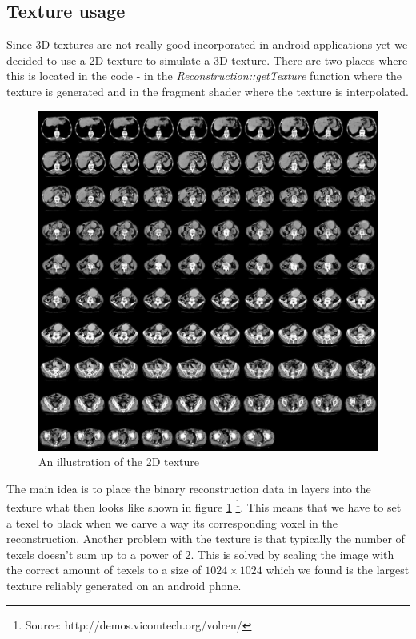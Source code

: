 \documentclass[10pt,twocolumn,letterpaper]{article}
\begin{document}
\subsection{Texture usage}

Since 3D textures are not really good incorporated in android applications yet we decided to use a 2D texture to simulate a 3D texture. There are two places where this is located in the code - in the \emph{Reconstruction::getTexture} function where the texture is generated and in the fragment shader where the texture is interpolated.

\begin{figure}[h]
	\begin{center}
		\includegraphics[width=0.8\linewidth]{./texture.jpg}
		\caption{An illustration of the 2D texture}
		\label{fig:texture}
	\end{center}
\end{figure}
The main idea is to place the binary reconstruction data in layers into the texture what then looks like shown in figure \ref{fig:texture} \footnote{Source: http://demos.vicomtech.org/volren/}. This means that we have to set a texel to black when we carve a way its corresponding voxel in the reconstruction. Another problem with the texture is that typically the number of texels doesn't sum up to a power of 2. This is solved by scaling the image with the correct amount of texels to a size of $1024 \times 1024$ which we found is the largest texture reliably generated on an android phone.
\end{document}
